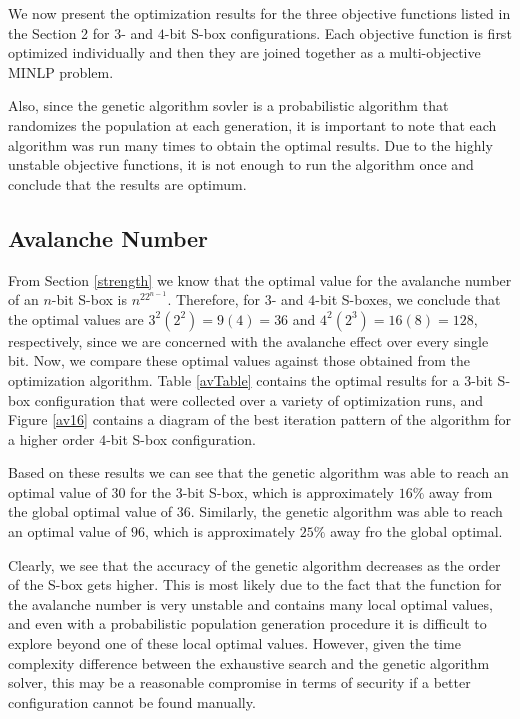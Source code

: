 \documentclass[11pt]{article}
\begin{document}
We now present the optimization results for the three objective functions listed in the Section 2 for $3$- and $4$-bit S-box configurations. Each objective function is first optimized individually and then they are joined together as a multi-objective MINLP problem. 

Also, since the genetic algorithm sovler is a probabilistic algorithm that randomizes the population at each generation, it is important to note that each algorithm was run many times to obtain the optimal results. Due to the highly unstable objective functions, it is not enough to run the algorithm once and conclude that the results are optimum. 

\subsection{Avalanche Number}

From Section \ref{strength} we know that the optimal value for the avalanche number of an $n$-bit S-box is $n^22^{n-1}$. Therefore, for $3$- and $4$-bit S-boxes, we conclude that the optimal values are $3^2(2^2) = 9(4) = 36$ and $4^2(2^3) = 16(8) = 128$, respectively, since we are concerned with the avalanche effect over every single bit. Now, we compare these optimal values against those obtained from the optimization algorithm. Table \ref{avTable} contains the optimal results for a $3$-bit S-box configuration that were collected over a variety of optimization runs, and Figure \ref{av16} contains a diagram of the best iteration pattern of the algorithm for a higher order $4$-bit S-box configuration. 

Based on these results we can see that the genetic algorithm was able to reach an optimal value of $30$ for the $3$-bit S-box, which is approximately $16\%$ away from the global optimal value of $36$. Similarly, the genetic algorithm was able to reach an optimal value of $96$, which is approximately $25\%$ away fro the global optimal. 

Clearly, we see that the accuracy of the genetic algorithm decreases as the order of the S-box gets higher. This is most likely due to the fact that the function for the avalanche number is very unstable and contains many local optimal values, and even with a probabilistic population generation procedure it is difficult to explore beyond one of these local optimal values. However, given the time complexity difference between the exhaustive search and the genetic algorithm solver, this may be a reasonable compromise in terms of security if a better configuration cannot be found manually. 
\end{document}
